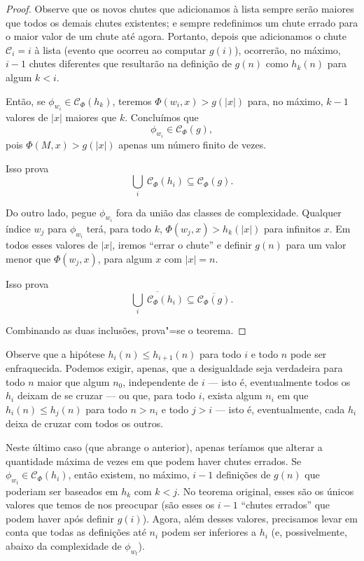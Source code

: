 \begin{proof}
    Observe que os novos chutes que adicionamos à lista
    sempre serão maiores que todos os demais chutes existentes;
    e sempre redefinimos um chute errado
    para o maior valor de um chute até agora.
    Portanto, depois que adicionamos o chute
    $\mathcal C_i = i$ à lista
    (evento que ocorreu ao computar $g(i)$),
    ocorrerão, no máximo,
    $i-1$ chutes diferentes
    que resultarão na definição de $g(n)$ como $h_k(n)$
    para algum $k < i$.

    Então, se $\phi_{w_i} \in \mathcal C_\Phi(h_k)$,
    teremos $\Phi(w_i, x) > g(|x|)$
    para, no máximo, $k-1$ valores de $|x|$ maiores que $k$.
    Concluímos que
    \begin{equation*}
        \phi_{w_i} \in \mathcal C_\Phi(g),
    \end{equation*}
    pois $\Phi(M, x) > g(|x|)$ apenas um número finito de vezes.

    Isso prova
    \begin{equation*}
        \bigcup_i \ \mathcal C_\Phi(h_i) \subseteq \mathcal C_\Phi(g).
    \end{equation*}

    Do outro lado,
    pegue $\phi_{w_i}$ fora da união das classes de complexidade.
    Qualquer índice $w_j$ para $\phi_{w_i}$
    terá, para todo $k$,
    $\Phi(w_j, x) > h_k(|x|)$ para infinitos $x$.
    Em todos esses valores de $|x|$,
    iremos ``errar o chute''
    e definir $g(n)$
    para um valor menor que $\Phi(w_j, x)$,
    para algum $x$ com $|x| = n$.

    Isso prova
    \begin{equation*}
        \overline{\bigcup_i \ \mathcal C_\Phi(h_i)}
        \subseteq \overline{\mathcal C_\Phi(g)}.
    \end{equation*}

    Combinando as duas inclusões, prova"=se o teorema.
\end{proof}

Observe que a hipótese $h_i(n) \leq h_{i+1}(n)$
para todo $i$ e todo $n$
pode ser enfraquecida.
Podemos exigir, apenas,
que a desigualdade seja verdadeira para todo $n$
maior que algum $n_0$,
independente de $i$
--- isto é, eventualmente todos os $h_i$
deixam de se cruzar
---
ou que, para todo $i$,
exista algum $n_i$ em que
$h_i(n) \leq h_j(n)$ para todo $n > n_i$
e todo $j > i$
--- isto é, eventualmente,
cada $h_i$ deixa de cruzar com todos os outros.

Neste último caso
(que abrange o anterior),
apenas teríamos que alterar a quantidade máxima de vezes
em que podem haver chutes errados.
Se $\phi_{w_t} \in \mathcal C_\Phi(h_i)$,
então existem, no máximo,
$i - 1$ definições de $g(n)$
que poderiam ser baseados em $h_k$
com $k < j$.
No teorema original,
esses são os únicos valores que temos de nos preocupar
(são esses os $i-1$ ``chutes errados'' que podem haver
após definir $g(i)$).
Agora, além desses valores,
precisamos levar em conta que
todas as definições até $n_i$
podem ser inferiores a $h_i$
(e, possivelmente, abaixo da complexidade de $\phi_{w_t}$).

